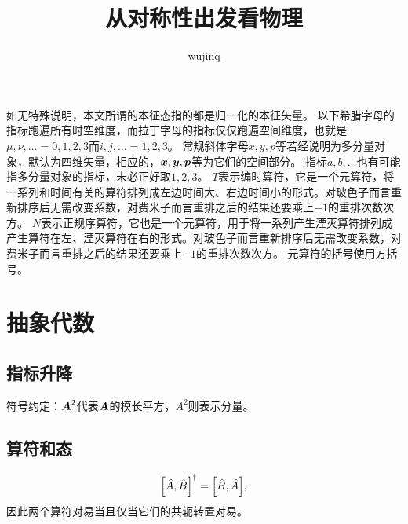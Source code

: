\documentclass[hyperref, UTF8, a4paper]{ctexart}
\title{从对称性出发看物理}
\author{wujinq}
\begin{document}
\maketitle

\vspace{2em}


如无特殊说明，本文所谓的本征态指的都是归一化的本征矢量。
以下希腊字母的指标跑遍所有时空维度，而拉丁字母的指标仅仅跑遍空间维度，也就是$\mu, \nu, \ldots = 0, 1, 2, 3$而$i, j, \ldots = 1, 2, 3$。
常规斜体字母$x, y, p$等若经说明为多分量对象，默认为四维矢量，相应的，$\vb*{x}, \vb*{y}, \vb*{p}$等为它们的空间部分。
指标$a,b,\ldots$也有可能指多分量对象的指标，未必正好取$1, 2, 3$。
$T$表示编时算符，它是一个元算符，将一系列和时间有关的算符排列成左边时间大、右边时间小的形式。对玻色子而言重新排序后无需改变系数，对费米子而言重排之后的结果还要乘上$-1$的重排次数次方。
$N$表示正规序算符，它也是一个元算符，用于将一系列产生湮灭算符排列成产生算符在左、湮灭算符在右的形式。对玻色子而言重新排序后无需改变系数，对费米子而言重排之后的结果还要乘上$-1$的重排次数次方。
元算符的括号使用方括号。

\section{抽象代数}

\subsection{指标升降}

符号约定：$\vb*{A}^2$代表$\vb*{A}$的模长平方，$A^2$则表示分量。

\subsection{算符和态}

\[
    \comm{\hat{A}}{\hat{B}}^\dagger = \comm{\hat{B}}{\hat{A}},
\]
因此两个算符对易当且仅当它们的共轭转置对易。

\end{document}
